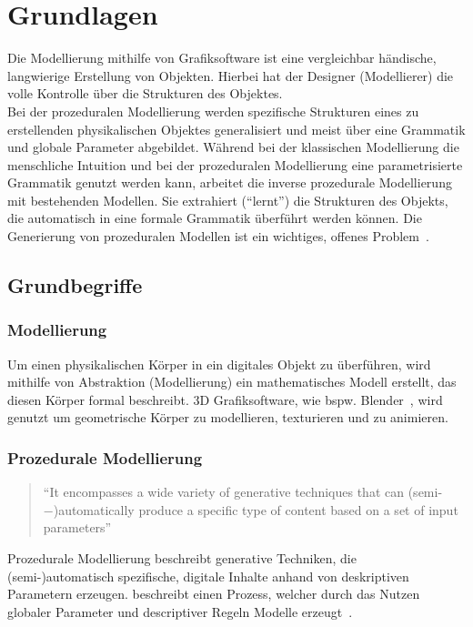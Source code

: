 
\chapter{Grundlagen}

Die Modellierung mithilfe von Grafiksoftware ist eine vergleichbar händische, langwierige Erstellung von
Objekten.
Hierbei hat der Designer (Modellierer) die volle Kontrolle über die Strukturen des Objektes.\\
Bei der prozeduralen Modellierung werden spezifische Strukturen eines zu erstellenden physikalischen Objektes
generalisiert und meist über eine Grammatik und globale Parameter abgebildet.
Während bei der klassischen Modellierung die menschliche Intuition und bei der prozeduralen Modellierung eine
parametrisierte Grammatik genutzt werden kann, arbeitet die inverse prozedurale Modellierung mit bestehenden Modellen.
Sie extrahiert ("`lernt"') die Strukturen des Objekts, die automatisch in eine formale Grammatik überführt werden können.
Die Generierung von prozeduralen Modellen ist ein wichtiges, offenes Problem~\cite{benes_2011}.

\section{Grundbegriffe}

\subsection*{Modellierung}
Um einen physikalischen Körper in ein digitales Objekt zu überführen, wird mithilfe von Abstraktion (Modellierung)
ein mathematisches Modell erstellt, das diesen Körper formal beschreibt.
3D Grafiksoftware, wie bspw. Blender~\cite{blender}, wird genutzt um geometrische Körper zu modellieren, texturieren
und zu animieren.

\newpage

\subsection*{Prozedurale Modellierung}
\begin{quote}
    "`It encompasses a wide variety of generative techniques that
    can (semi-−)automatically produce a specific type of content based on a set of input
    parameters"'~\cite{smelik_2014}
\end{quote}
Prozedurale Modellierung beschreibt generative Techniken, die \\(semi-)automatisch spezifische, digitale
Inhalte anhand von deskriptiven Parametern erzeugen.
\citeauthor{smelik_2014} beschreibt einen Prozess, welcher durch das Nutzen globaler Parameter und descriptiver Regeln
Modelle erzeugt~\cite{smelik_2014}.

